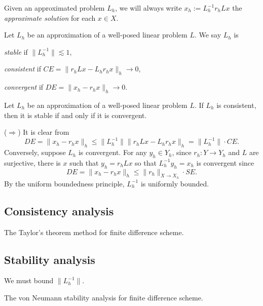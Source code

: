 \documentclass[a4paper]{article}
\begin{document}
Given an approximated problem $L_h$, we will always write $x_h:=L_h^{-1}r_hLx$ the \emph{approximate solution} for each $x\in X$.

\begin{defn}
Let $L_h$ be an approximation of a well-posed linear problem $L$.
We say $L_h$ is
\begin{parts}
\item \emph{stable} if $\|L_h^{-1}\|\lesssim1$,
\item \emph{consistent} if $CE=\|r_hLx-L_hr_hx\|_h\to0$,
\item \emph{convergent} if $DE=\|x_h-r_hx\|_h\to0$.
\end{parts}
\end{defn}

\begin{thm}
Let $L_h$ be an approximation of a well-posed linear problem $L$.
If $L_h$ is consistent, then it is stable if and only if it is convergent.
\end{thm}
\begin{pf}
($\Rightarrow$)
It is clear from
\[DE=\|x_h-r_hx\|_h\le\|L_h^{-1}\|\|r_hLx-L_hr_hx\|_h=\|L_h^{-1}\|\cdot CE.\]
Conversely, suppose $L_h$ is convergent.
For any $y_h\in Y_h$, since $r_h:Y\to Y_h$ and $L$ are surjective, there is $x$ such that $y_h=r_hLx$ so that $L_h^{-1}y_h=x_h$ is convergent since
\[DE=\|x_h-r_hx\|_h\le\|r_h\|_{X\to X_h}\cdot SE.\]
By the uniform boundedness principle, $L_h^{-1}$ is uniformly bounded.
\end{pf}


\begin{ex}

\end{ex}


\subsection{Consistency analysis}
The Taylor's theorem method for finite difference scheme.

\subsection{Stability analysis}
We must bound $\|L_h^{-1}\|$.

The von Neumann stability analysis for finite difference scheme.
\end{document}
